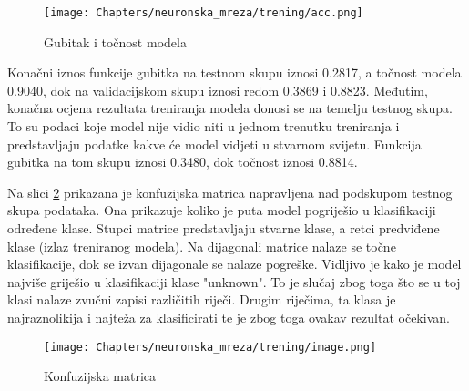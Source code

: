 \begin{figure}[htb]
    \centering
    \texttt{[image: Chapters/neuronska\_mreza/trening/acc.png]} 
    \caption{Gubitak i točnost modela}
    \label{pic:accuracy}
\end{figure}

Konačni iznos funkcije gubitka na testnom skupu iznosi 0.2817, a točnost modela 0.9040, dok
na validacijskom skupu iznosi redom 0.3869 i 0.8823. Međutim, konačna ocjena rezultata
treniranja modela donosi se na temelju testnog skupa. To su podaci koje model nije vidio
niti u jednom trenutku treniranja i predstavljaju podatke kakve će model vidjeti u stvarnom
svijetu. Funkcija gubitka na tom skupu iznosi 0.3480, dok točnost iznosi 0.8814.

Na slici \ref{pic:confmtrx} prikazana je konfuzijska matrica napravljena nad podskupom
testnog skupa podataka. Ona prikazuje koliko je puta model pogriješio u klasifikaciji
određene klase. Stupci matrice predstavljaju stvarne klase, a retci predviđene klase
(izlaz treniranog modela). Na dijagonali matrice nalaze se točne klasifikacije, dok
se izvan dijagonale se nalaze pogreške. Vidljivo je kako je model najviše griješio
u klasifikaciji klase "unknown". To je slučaj zbog toga što se u toj klasi nalaze
zvučni zapisi različitih riječi. Drugim riječima, ta klasa je najraznolikija i najteža
za klasificirati te je zbog toga ovakav rezultat očekivan.

\begin{figure}[htb]
    \centering
    \texttt{[image: Chapters/neuronska\_mreza/trening/image.png]} 
    \caption{Konfuzijska matrica}
    \label{pic:confmtrx}
\end{figure}
